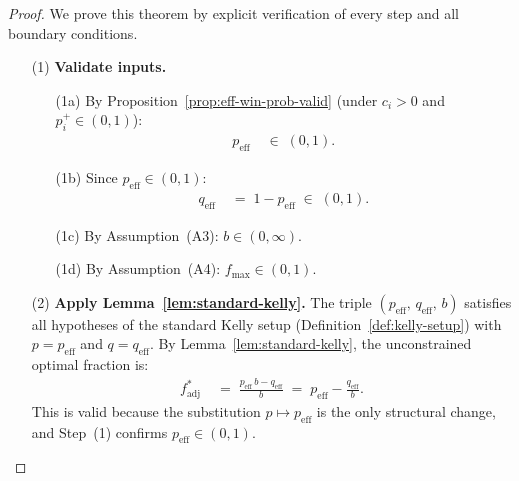\documentclass[12pt,openany]{book}
\numberwithin{equation}{chapter}
\theoremstyle{plain}
\theoremstyle{definition}
\theoremstyle{remark}
\numberwithin{equation}{chapter}
\theoremstyle{plain}
\begin{document}
\begin{proof}
We prove this theorem by explicit verification of every step and
all boundary conditions.

\begin{enumerate}
  \item[\textup{(1)}] \textbf{Validate inputs.}
        \begin{enumerate}
          \item[\textup{(1a)}] By
                Proposition~\ref{prop:eff-win-prob-valid}
                (under $c_i > 0$ and $p_i^+ \in (0,1)$):
                \begin{align}
                  p_{\mathrm{eff}} &\;\in\; (0,1).
                  \label{eq:kelly-peff-valid}
                \end{align}
          \item[\textup{(1b)}] Since
                $p_{\mathrm{eff}} \in (0,1)$:
                \begin{align}
                  q_{\mathrm{eff}}
                  &\;=\; 1 - p_{\mathrm{eff}}
                  \;\in\; (0,1).
                  \label{eq:kelly-qeff-valid}
                \end{align}
          \item[\textup{(1c)}] By Assumption~\textup{(A3)}:
                $b \in (0,\infty)$.
          \item[\textup{(1d)}] By Assumption~\textup{(A4)}:
                $f_{\max} \in (0,1)$.
        \end{enumerate}

  \item[\textup{(2)}] \textbf{Apply Lemma~\ref{lem:standard-kelly}.}
        The triple $(p_{\mathrm{eff}},\, q_{\mathrm{eff}},\, b)$
        satisfies all hypotheses of the standard Kelly setup
        (Definition~\ref{def:kelly-setup}) with
        $p = p_{\mathrm{eff}}$ and $q = q_{\mathrm{eff}}$.
        By Lemma~\ref{lem:standard-kelly}, the unconstrained
        optimal fraction is:
        \begin{align}
          f^*_{\mathrm{adj}}
          &\;=\; \frac{p_{\mathrm{eff}}\,b - q_{\mathrm{eff}}}{b}
          \;=\; p_{\mathrm{eff}} - \frac{q_{\mathrm{eff}}}{b}.
          \label{eq:kelly-adj-derived}
        \end{align}
        This is valid because the substitution $p \mapsto
        p_{\mathrm{eff}}$ is the only structural change, and
        Step~(1) confirms $p_{\mathrm{eff}} \in (0,1)$.


\end{enumerate}
\end{proof}
\end{document}
